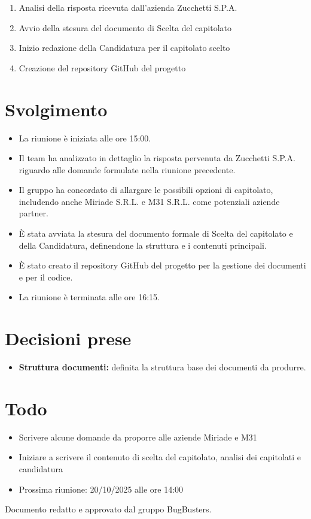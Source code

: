 \documentclass[a4paper,12pt]{article}
\begin{document}
\begin{enumerate}
    \item Analisi della risposta ricevuta dall'azienda Zucchetti S.P.A.
    \item Avvio della stesura del documento di Scelta del capitolato
    \item Inizio redazione della Candidatura per il capitolato scelto
    \item Creazione del repository GitHub del progetto
\end{enumerate}

\section{Svolgimento}

\begin{itemize}
    \item La riunione è iniziata alle ore 15:00.
    \item Il team ha analizzato in dettaglio la risposta pervenuta da Zucchetti S.P.A. riguardo alle domande formulate nella riunione precedente.
    \item Il gruppo ha concordato di allargare le possibili opzioni di capitolato, includendo anche Miriade S.R.L. e M31 S.R.L. come potenziali aziende partner.
    \item È stata avviata la stesura del documento formale di Scelta del capitolato e della Candidatura, definendone la struttura e i contenuti principali.
    \item È stato creato il repository GitHub del progetto per la gestione dei documenti e per il codice.
    \item La riunione è terminata alle ore 16:15.
\end{itemize}

\section{Decisioni prese}

\begin{itemize}
    \item \textbf{Struttura documenti:} definita la struttura base dei documenti da produrre.
\end{itemize}

\section{Todo}

\begin{tcolorbox}[colback=secondaryblue!8,colframe=secondaryblue!60,arc=2mm,boxrule=0.5pt,left=10pt,right=10pt]
\begin{itemize}[topsep=5pt]
    \item Scrivere alcune domande da proporre alle aziende Miriade e M31
    \item Iniziare a scrivere il contenuto di scelta del capitolato, analisi dei capitolati e candidatura
    \item Prossima riunione: 20/10/2025 alle ore 14:00
\end{itemize}
\end{tcolorbox}

\vfill
\begin{center}
    {\small\color{darkgray} Documento redatto e approvato dal gruppo BugBusters.}
\end{center}
\end{document}
